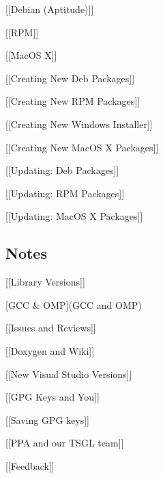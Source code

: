 \begin{DoxyItemize}
\item \mbox{[}\mbox{[}Debian (Aptitude)\mbox{]}\mbox{]}
\item \mbox{[}\mbox{[}R\-P\-M\mbox{]}\mbox{]}
\item \mbox{[}\mbox{[}Mac\-O\-S X\mbox{]}\mbox{]}
\item \mbox{[}\mbox{[}Creating New Deb Packages\mbox{]}\mbox{]}
\item \mbox{[}\mbox{[}Creating New R\-P\-M Packages\mbox{]}\mbox{]}
\item \mbox{[}\mbox{[}Creating New Windows Installer\mbox{]}\mbox{]}
\item \mbox{[}\mbox{[}Creating New Mac\-O\-S X Packages\mbox{]}\mbox{]}
\item \mbox{[}\mbox{[}Updating\-: Deb Packages\mbox{]}\mbox{]}
\item \mbox{[}\mbox{[}Updating\-: R\-P\-M Packages\mbox{]}\mbox{]}
\item \mbox{[}\mbox{[}Updating\-: Mac\-O\-S X Packages\mbox{]}\mbox{]}
\end{DoxyItemize}

\subsection*{Notes}


\begin{DoxyItemize}
\item \mbox{[}\mbox{[}Library Versions\mbox{]}\mbox{]}
\item \mbox{[}G\-C\-C \& O\-M\-P\mbox{]}(G\-C\-C and O\-M\-P)
\item \mbox{[}\mbox{[}Issues and Reviews\mbox{]}\mbox{]}
\item \mbox{[}\mbox{[}Doxygen and Wiki\mbox{]}\mbox{]}
\item \mbox{[}\mbox{[}New Visual Studio Versions\mbox{]}\mbox{]}
\item \mbox{[}\mbox{[}G\-P\-G Keys and You\mbox{]}\mbox{]}
\item \mbox{[}\mbox{[}Saving G\-P\-G keys\mbox{]}\mbox{]}
\item \mbox{[}\mbox{[}P\-P\-A and our T\-S\-G\-L team\mbox{]}\mbox{]}
\item \mbox{[}\mbox{[}Feedback\mbox{]}\mbox{]} 
\end{DoxyItemize}